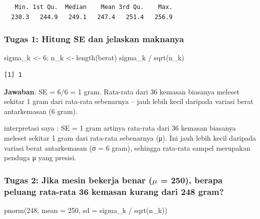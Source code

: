 \documentclass[
  indonesian,
  letterpaper,
]{book}
\newenvironment{Shaded}{\begin{snugshade}}{\end{snugshade}}
\newcommand{\AttributeTok}[1]{\textcolor[rgb]{0.40,0.45,0.13}{#1}}
\newcommand{\DecValTok}[1]{\textcolor[rgb]{0.68,0.00,0.00}{#1}}
\newcommand{\FunctionTok}[1]{\textcolor[rgb]{0.28,0.35,0.67}{#1}}
\newcommand{\NormalTok}[1]{\textcolor[rgb]{0.00,0.23,0.31}{#1}}
\newcommand{\OtherTok}[1]{\textcolor[rgb]{0.00,0.23,0.31}{#1}}
\newcommand{\SpecialCharTok}[1]{\textcolor[rgb]{0.37,0.37,0.37}{#1}}
\begin{document}
\begin{verbatim}
   Min. 1st Qu.  Median    Mean 3rd Qu.    Max. 
  230.3   244.9   249.1   247.4   251.4   256.9 
\end{verbatim}

\subsubsection{Tugas 1: Hitung SE dan jelaskan
maknanya}\label{tugas-1-hitung-se-dan-jelaskan-maknanya}

\begin{Shaded}
\begin{Highlighting}[]
\NormalTok{sigma\_k }\OtherTok{\textless{}{-}} \DecValTok{6}\NormalTok{; n\_k }\OtherTok{\textless{}{-}} \FunctionTok{length}\NormalTok{(berat)}
\NormalTok{sigma\_k }\SpecialCharTok{/} \FunctionTok{sqrt}\NormalTok{(n\_k)}
\end{Highlighting}
\end{Shaded}

\begin{verbatim}
[1] 1
\end{verbatim}

\textbf{Jawaban}: SE = 6/6 = 1 gram. Rata-rata dari 36 kemasan biasanya
meleset sekitar 1 gram dari rata-rata sebenarnya -- jauh lebih kecil
daripada variasi berat antarkemasan (6 gram).

interpretasi saya : SE = 1 gram artinya rata-rata dari 36 kemasan
biasanya meleset sekitar 1 gram dari rata-rata sebenarnya (μ). Ini jauh
lebih kecil daripada variasi berat antarkemasan (σ = 6 gram), sehingga
rata-rata sampel merupakan penduga μ yang presisi.

\subsubsection{\texorpdfstring{Tugas 2: Jika mesin bekerja benar
(\(\mu\) = 250), berapa peluang rata-rata 36 kemasan kurang dari 248
gram?}{Tugas 2: Jika mesin bekerja benar (\textbackslash mu = 250), berapa peluang rata-rata 36 kemasan kurang dari 248 gram?}}\label{tugas-2-jika-mesin-bekerja-benar-mu-250-berapa-peluang-rata-rata-36-kemasan-kurang-dari-248-gram}

\begin{Shaded}
\begin{Highlighting}[]
\FunctionTok{pnorm}\NormalTok{(}\DecValTok{248}\NormalTok{, }\AttributeTok{mean =} \DecValTok{250}\NormalTok{, }\AttributeTok{sd =}\NormalTok{ sigma\_k }\SpecialCharTok{/} \FunctionTok{sqrt}\NormalTok{(n\_k))}
\end{Highlighting}
\end{Shaded}
\end{document}
